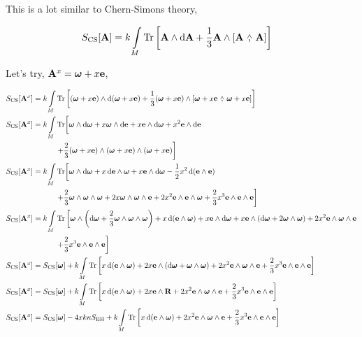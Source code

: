 This is a lot similar to Chern-Simons theory,

\begin{align*}
    S_{\textnormal{CS}}\qty[\vb A]&=k\int\limits_M\Tr\qty[\vb A\wedge\dd{\vb A}+\frac13\vb A\wedge\wedgecomm{\vb A}{\vb A}]
\end{align*}

Let's try, $\vb A^x=\boldsymbol\omega+x\vb e$,

\begin{align*}
    S_{\textnormal{CS}}\qty[\vb A^x]&=k\int\limits_M\Tr\qty[\qty(\boldsymbol\omega+x\vb e)\wedge\dd{\qty(\boldsymbol\omega+x\vb e)}+\frac13\qty(\boldsymbol\omega+x\vb e)\wedge\wedgecomm{\boldsymbol\omega+x\vb e}{\boldsymbol\omega+x\vb e}]\\
    S_{\textnormal{CS}}\qty[\vb A^x]&=k\int\limits_M\Tr\biggl[\boldsymbol\omega\wedge\dd{\boldsymbol\omega}+x\boldsymbol\omega\wedge\dd{\vb e}+x\vb e\wedge\dd{\boldsymbol\omega}+x^2\vb e\wedge\dd{\vb e}\\
    &\quad\quad\quad\left.+\frac23\qty(\boldsymbol\omega+x\vb e)\wedge\qty(\boldsymbol\omega+x\vb e)\wedge\qty(\boldsymbol\omega+x\vb e)\right]\\
    S_{\textnormal{CS}}\qty[\vb A^x]&=k\int\limits_M\Tr\biggl[\boldsymbol\omega\wedge\dd{\boldsymbol\omega}+x\dd{\vb e}\wedge\boldsymbol\omega+x\vb e\wedge\dd{\boldsymbol\omega}-\frac12x^2\dd{\qty(\vb e\wedge\vb e)}\\
    &\quad\quad\quad\left.+\frac23\boldsymbol\omega\wedge\boldsymbol\omega\wedge\boldsymbol\omega+2x\boldsymbol\omega\wedge\boldsymbol\omega\wedge\vb e+2x^2\vb e\wedge\vb e\wedge \boldsymbol\omega+\frac23x^3\vb e\wedge\vb e\wedge\vb e\right]\\
    S_{\textnormal{CS}}\qty[\vb A^x]&=k\int\limits_M\Tr\left[\boldsymbol\omega\wedge\qty(\dd{\boldsymbol\omega}+\frac23\boldsymbol\omega\wedge\boldsymbol\omega\wedge\boldsymbol\omega)+x\dd{\qty(\vb e\wedge\boldsymbol\omega)}+x\vb e\wedge\dd{\boldsymbol\omega}+x\vb e\wedge\qty(\dd{\boldsymbol\omega}+2\boldsymbol\omega\wedge\boldsymbol\omega)+2x^2\vb e\wedge\boldsymbol\omega\wedge\vb e\right.\\
    &\quad\quad\quad\left.+\frac23x^3\vb e\wedge\vb e\wedge\vb e\right]\\
    S_{\textnormal{CS}}\qty[\vb A^x]&=S_{\textnormal{CS}}\qty[\boldsymbol\omega]+k\int\limits_M\Tr\qty[x\dd{\qty(\vb e\wedge\boldsymbol\omega)}+2x\vb e\wedge\qty(\dd{\boldsymbol\omega}+\boldsymbol\omega\wedge\boldsymbol\omega)+2x^2\vb e\wedge\boldsymbol\omega\wedge\vb e+\frac23x^3\vb e\wedge\vb e\wedge\vb e]\\
    S_{\textnormal{CS}}\qty[\vb A^x]&=S_{\textnormal{CS}}\qty[\boldsymbol\omega]+k\int\limits_M\Tr\qty[x\dd{\qty(\vb e\wedge\boldsymbol\omega)}+2x\vb e\wedge\vb R+2x^2\vb e\wedge\boldsymbol\omega\wedge\vb e+\frac23x^3\vb e\wedge\vb e\wedge\vb e]\\
    S_{\textnormal{CS}}\qty[\vb A^x]&=S_{\textnormal{CS}}\qty[\boldsymbol\omega]-4xk\kappa S_{\textnormal{EH}}+k\int\limits_M\Tr\qty[x\dd{\qty(\vb e\wedge\boldsymbol\omega)}+2x^2\vb e\wedge\boldsymbol\omega\wedge\vb e+\frac23x^3\vb e\wedge\vb e\wedge\vb e]
\end{align*}

